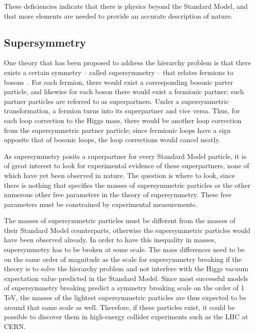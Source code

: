 These deficiencies indicate that there is physics beyond the Standard Model, and that more elements are needed to provide an accurate description of nature.

\subsection{Supersymmetry}

One theory that has been proposed to address the hierarchy problem is that there exists a certain symmetry -- called supersymmetry -- that relates fermions to bosons~\cite{Martin:1997ns}. For each fermion, there would exist a corresponding bosonic parter particle, and likewise for each boson there would exist a fermionic partner; such partner particles are referred to as superpartners. Under a supersymmetric transformation, a fermion turns into its superpartner and vice versa. Thus, for each loop correction to the Higgs mass, there would be another loop correction from the supersymmetric partner particle; since fermionic loops have a sign opposite that of bosonic loops, the loop corrections would cancel neatly.

As supersymmetry posits a superpartner for every Standard Model particle, it is of great interest to look for experimental evidence of these superpartners, none of which have yet been observed in nature. The question is where to look, since there is nothing that specifies the masses of supersymmetric particles or the other numerous other free parameters in the theory of supersymmetry. These free parameters must be constrained by experimental measurements.

The masses of supersymmetric particles must be different from the masses of their Standard Model counterparts, otherwise the supersymmetric particles would have been observed already. In order to have this inequality in masses, supersymmetry has to be broken at some scale. The mass differences need to be on the same order of magnitude as the scale for supersymmetry breaking if the theory is to solve the hierarchy problem and not interfere with the Higgs vacuum expectation value predicted in the Standard Model. Since most successful models of supersymmetry breaking predict a symmetry breaking scale on the order of 1 TeV, the masses of the lightest supersymmetric particles are thus expected to be around that same scale as well. Therefore, if these particles exist, it could be possible to discover them in high-energy collider experiments such as the LHC at CERN.

